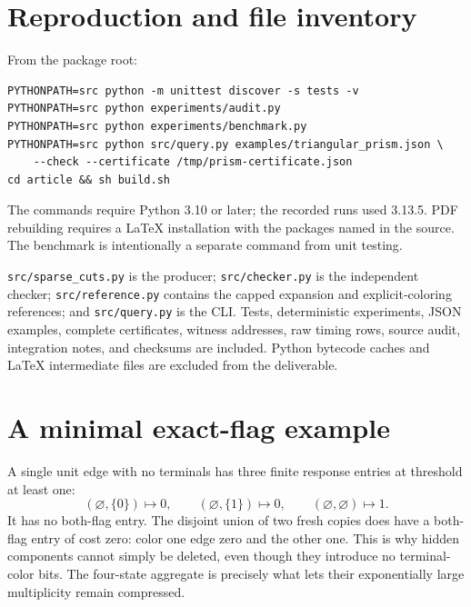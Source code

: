 \documentclass[11pt,a4paper]{article}
\theoremstyle{definition}
\theoremstyle{remark}
\newcommand{\code}[1]{\nolinkurl{#1}}
\begin{document}
\section{Reproduction and file inventory}
From the package root:
\begin{verbatim}
PYTHONPATH=src python -m unittest discover -s tests -v
PYTHONPATH=src python experiments/audit.py
PYTHONPATH=src python experiments/benchmark.py
PYTHONPATH=src python src/query.py examples/triangular_prism.json \
    --check --certificate /tmp/prism-certificate.json
cd article && sh build.sh
\end{verbatim}
The commands require Python 3.10 or later; the recorded runs used 3.13.5. PDF rebuilding requires a LaTeX installation with the packages named in the source. The benchmark is intentionally a separate command from unit testing.

\code{src/sparse_cuts.py} is the producer; \code{src/checker.py} is the independent checker; \code{src/reference.py} contains the capped expansion and explicit-coloring references; and \code{src/query.py} is the CLI. Tests, deterministic experiments, JSON examples, complete certificates, witness addresses, raw timing rows, source audit, integration notes, and checksums are included. Python bytecode caches and LaTeX intermediate files are excluded from the deliverable.

\section{A minimal exact-flag example}
A single unit edge with no terminals has three finite response entries at threshold at least one:
\[
 (\varnothing,\{0\})\mapsto0,\qquad
 (\varnothing,\{1\})\mapsto0,\qquad
 (\varnothing,\varnothing)\mapsto1.
\]
It has no both-flag entry. The disjoint union of two fresh copies does have a both-flag entry of cost zero: color one edge zero and the other one. This is why hidden components cannot simply be deleted, even though they introduce no terminal-color bits. The four-state aggregate is precisely what lets their exponentially large multiplicity remain compressed.
\end{document}
